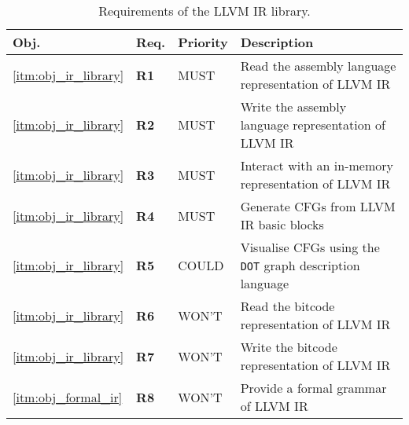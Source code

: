 \begin{table}[htbp]
	\begin{center}
		\begin{tabular}{|l|l|l|l|}
			\hline
			Obj. & Req. & Priority & Description \\
			\hline
			\ref{itm:obj_ir_library} & \textbf{R1} & MUST & Read the assembly language representation of LLVM IR \\
			\ref{itm:obj_ir_library} & \textbf{R2} & MUST & Write the assembly language representation of LLVM IR \\
			\ref{itm:obj_ir_library} & \textbf{R3} & MUST & Interact with an in-memory representation of LLVM IR \\
			\ref{itm:obj_ir_library} & \textbf{R4} & MUST & Generate CFGs from LLVM IR basic blocks \\
			\hline
			\ref{itm:obj_ir_library} & \textbf{R5} & COULD & Visualise CFGs using the \texttt{DOT} graph description language \\
			\hline
			\ref{itm:obj_ir_library} & \textbf{R6} & WON'T & Read the bitcode representation of LLVM IR \\
			\ref{itm:obj_ir_library} & \textbf{R7} & WON'T & Write the bitcode representation of LLVM IR \\
			\ref{itm:obj_formal_ir} & \textbf{R8} & WON'T & Provide a formal grammar of LLVM IR \\
			\hline
		\end{tabular}
	\end{center}
	\caption{Requirements of the LLVM IR library.}
\end{table}
